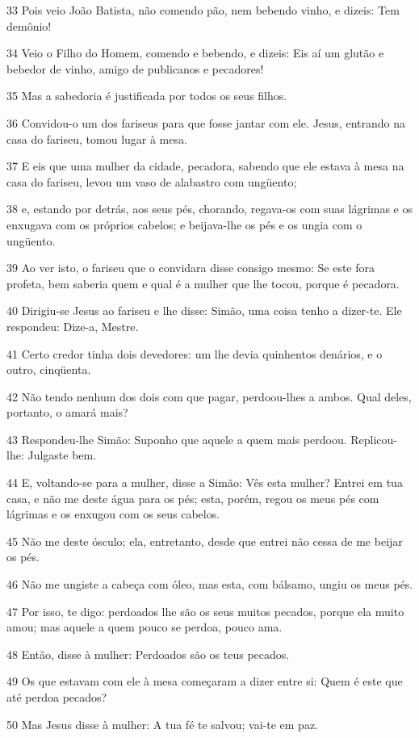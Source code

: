 \par 33 Pois veio João Batista, não comendo pão, nem bebendo vinho, e dizeis: Tem demônio!
\par 34 Veio o Filho do Homem, comendo e bebendo, e dizeis: Eis aí um glutão e bebedor de vinho, amigo de publicanos e pecadores!
\par 35 Mas a sabedoria é justificada por todos os seus filhos.
\par 36 Convidou-o um dos fariseus para que fosse jantar com ele. Jesus, entrando na casa do fariseu, tomou lugar à mesa.
\par 37 E eis que uma mulher da cidade, pecadora, sabendo que ele estava à mesa na casa do fariseu, levou um vaso de alabastro com ungüento;
\par 38 e, estando por detrás, aos seus pés, chorando, regava-os com suas lágrimas e os enxugava com os próprios cabelos; e beijava-lhe os pés e os ungia com o ungüento.
\par 39 Ao ver isto, o fariseu que o convidara disse consigo mesmo: Se este fora profeta, bem saberia quem e qual é a mulher que lhe tocou, porque é pecadora.
\par 40 Dirigiu-se Jesus ao fariseu e lhe disse: Simão, uma coisa tenho a dizer-te. Ele respondeu: Dize-a, Mestre.
\par 41 Certo credor tinha dois devedores: um lhe devia quinhentos denários, e o outro, cinqüenta.
\par 42 Não tendo nenhum dos dois com que pagar, perdoou-lhes a ambos. Qual deles, portanto, o amará mais?
\par 43 Respondeu-lhe Simão: Suponho que aquele a quem mais perdoou. Replicou-lhe: Julgaste bem.
\par 44 E, voltando-se para a mulher, disse a Simão: Vês esta mulher? Entrei em tua casa, e não me deste água para os pés; esta, porém, regou os meus pés com lágrimas e os enxugou com os seus cabelos.
\par 45 Não me deste ósculo; ela, entretanto, desde que entrei não cessa de me beijar os pés.
\par 46 Não me ungiste a cabeça com óleo, mas esta, com bálsamo, ungiu os meus pés.
\par 47 Por isso, te digo: perdoados lhe são os seus muitos pecados, porque ela muito amou; mas aquele a quem pouco se perdoa, pouco ama.
\par 48 Então, disse à mulher: Perdoados são os teus pecados.
\par 49 Os que estavam com ele à mesa começaram a dizer entre si: Quem é este que até perdoa pecados?
\par 50 Mas Jesus disse à mulher: A tua fé te salvou; vai-te em paz.

